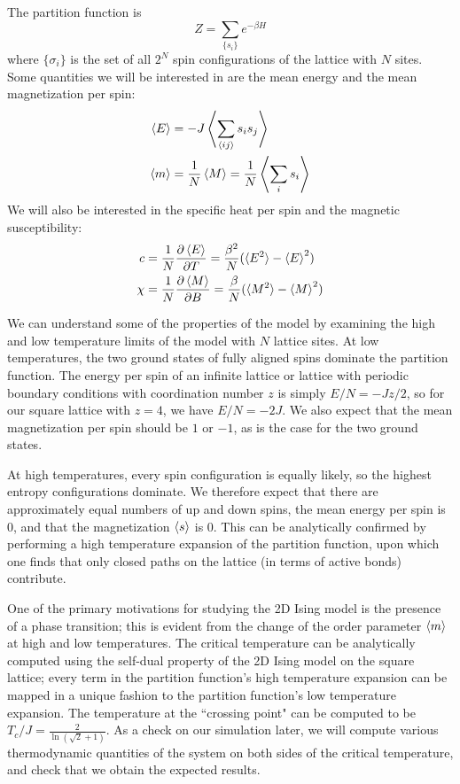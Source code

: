 \documentclass[twocolumn,aps,prl]{revtex4-1} %
\newcommand{\pd}{\partial}
\begin{document}
The partition function is
\begin{equation}
Z = \sum_{\{s_i\}}e^{-\beta H}
\end{equation}
where $\{\sigma_i\}$ is the set of all $2^N$ spin configurations of the lattice with $N$ sites. Some quantities we will be interested in are the mean energy and the mean magnetization per spin:
\begin{align}
\braket{E} &= -J \left\langle\sum_{\braket{ij}}s_is_j\right\rangle \\
\braket{m} &= \frac{1}{N}\braket{M} = \frac{1}{N}\left\langle\sum_is_i\right\rangle 
\end{align}
We will also be interested in the specific heat per spin and the magnetic susceptibility:
\begin{align}
c &= \frac{1}{N}\frac{\pd \braket{E}}{\pd T} = \frac{\beta^2}{N}(\braket{E^2} - \braket{E}^2) \\
\chi &= \frac{1}{N}\frac{\pd \braket{M}}{\pd B} = \frac{\beta}{N} (\braket{M^2} - \braket{M}^2)
\end{align}

We can understand some of the properties of the model by examining the high and low temperature limits of the model with $N$ lattice sites. At low temperatures, the two ground states of fully aligned spins dominate the partition function. The energy per spin of an infinite lattice or lattice with periodic boundary conditions with coordination number $z$ is simply $E/N = -Jz/2$, so for our square lattice with $z = 4$, we have $E/N = -2J$. We also expect that the mean magnetization per spin should be $1$ or $-1$, as is the case for the two ground states.

At high temperatures, every spin configuration is equally likely, so the highest entropy configurations dominate. We therefore expect that there are approximately equal numbers of up and down spins, the mean energy per spin is 0, and that the magnetization $\braket{s}$ is 0. This can be analytically confirmed by performing a high temperature expansion of the partition function, upon which one finds that only closed paths on the lattice (in terms of active bonds) contribute. 

One of the primary motivations for studying the 2D Ising model is the presence of a phase transition; this is evident from the change of the order parameter $\braket{m}$ at high and low temperatures. The critical temperature can be analytically computed using the self-dual property of the 2D Ising model on the square lattice; every term in the partition function's high temperature expansion can be mapped in a unique fashion to the partition function's low temperature expansion. The temperature at the ``crossing point" can be computed to be $T_c/J = \frac{2}{\ln(\sqrt{2}+1)}$. As a check on our simulation later, we will compute various thermodynamic quantities of the system on both sides of the critical temperature, and check that we obtain the expected results.
\end{document}
